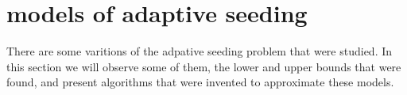 \section{models of adaptive seeding}\label{sec:models}
There are some varitions of the adpative seeding problem that were studied. In this section we will observe some of them, the lower and upper bounds that were found, and present algorithms that were invented to approximate these models.


